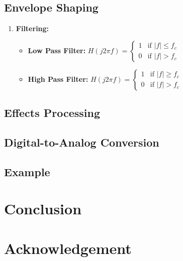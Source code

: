 \documentclass[12pt]{article}
\begin{document}
\subsection{Envelope Shaping}
\begin{enumerate}
    \item \textbf{Filtering:}
    \begin{itemize}
        \item \textbf{Low Pass Filter:}
            $H(j2\pi f) = 
            \begin{cases} 
            1 & \text{if } |f| \leq f_c \\
            0 & \text{if } |f| > f_c 
            \end{cases}$
        \item \textbf{High Pass Filter:}
            $H(j2\pi f) = 
            \begin{cases} 
            1 & \text{if } |f| \geq f_c \\
            0 & \text{if } |f| > f_c 
            \end{cases}$
    \end{itemize}


\end{enumerate}

\subsection{Effects Processing}

\subsection{Digital-to-Analog Conversion}

\subsection{Example}

\section{Conclusion}

\section*{Acknowledgement}
\end{document}
